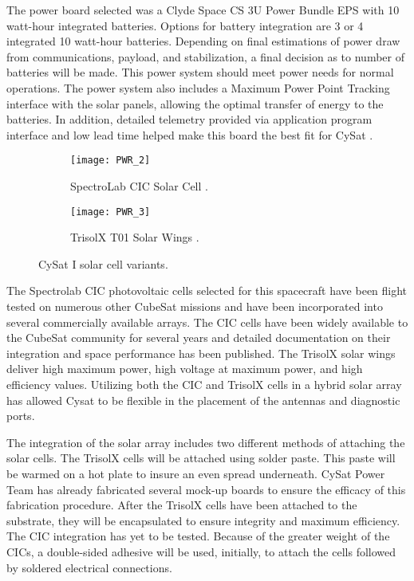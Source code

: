 \documentclass[nocover]            %
{CSLI}                       %
\begin{document}
The power board selected was a Clyde Space CS 3U Power Bundle EPS with 10 watt-hour integrated batteries. Options for battery integration are 3 or 4 integrated 10 watt-hour batteries. Depending on final estimations of power draw from communications, payload, and stabilization, a final decision as to number of batteries will be made. This power system should meet power needs for normal operations. The power system also includes a Maximum Power Point Tracking interface with the solar panels, allowing the optimal transfer of energy to the batteries. In addition, detailed telemetry provided via application program interface and low lead time helped make this board the best fit for CySat \cite{Clyde Space}.

\begin{figure}[H]
\centering
\begin{subfigure}[b]{0.4\textwidth}
\texttt{[image: PWR\_2]}
\caption{SpectroLab CIC Solar Cell \cite{Spectrolab}.}
\end{subfigure}
\hfill
\begin{subfigure}[b]{0.4\textwidth}
\texttt{[image: PWR\_3]}
\caption{TrisolX T01 Solar Wings \cite{TrisolX}.}
\end{subfigure}
\caption{CySat I solar cell variants.}
\end{figure}





The Spectrolab CIC photovoltaic cells selected for this spacecraft have been flight tested on numerous other CubeSat missions and have been incorporated into several commercially available arrays. The CIC cells have been widely available to the CubeSat community for several years and detailed documentation on their integration and space performance has been published. The TrisolX solar wings deliver high maximum power, high voltage at maximum power, and high efficiency values. Utilizing both the CIC and TrisolX cells in a hybrid solar array has allowed Cysat to be flexible in the placement of the antennas and diagnostic ports.



The integration of the solar array includes two different methods of attaching the solar cells. The TrisolX cells will be attached using solder paste. This paste will be warmed on a hot plate to insure an even spread underneath. CySat Power Team has already fabricated several mock-up boards to ensure the efficacy of this fabrication procedure. After the TrisolX cells have been attached to the substrate, they will be encapsulated to ensure integrity and maximum efficiency. The CIC integration has yet to be tested. Because of the greater weight of the CICs, a double-sided adhesive will be used, initially, to attach the cells followed by soldered electrical connections.
\end{document}
